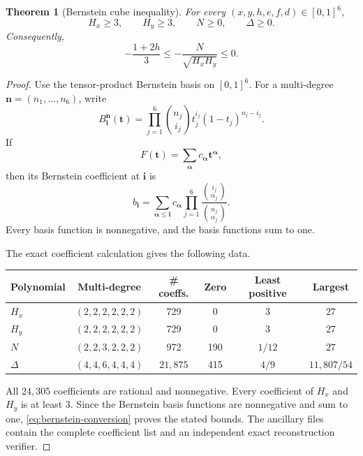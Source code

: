 \documentclass[11pt]{amsart}
\newtheorem{theorem}{Theorem}[section]
\theoremstyle{definition}
\theoremstyle{remark}
\begin{document}
\begin{theorem}[Bernstein cube inequality]\label{thm:cube}
For every \((x,y,h,e,f,d)\in[0,1]^6\),
\[
 H_x\geq3,
 \qquad
 H_y\geq3,
 \qquad
 N\geq0,
 \qquad
 \Delta\geq0.
\]
Consequently,
\begin{equation}\label{eq:cube-correlation}
 -\frac{1+2h}{3}
 \leq
 -\frac{N}{\sqrt{H_xH_y}}
 \leq0.
\end{equation}
\end{theorem}

\begin{proof}
Use the tensor-product Bernstein basis on \([0,1]^6\). For a multi-degree \(\mathbf n=(n_1,\ldots,n_6)\), write
\[
 B_{\mathbf i}^{\mathbf n}(\mathbf t)
 =\prod_{j=1}^6
 \binom{n_j}{i_j}t_j^{i_j}(1-t_j)^{n_j-i_j}.
\]
If
\[
 F(\mathbf t)=\sum_{\boldsymbol\alpha}c_{\boldsymbol\alpha}
 \mathbf t^{\boldsymbol\alpha},
\]
then its Bernstein coefficient at \(\mathbf i\) is
\begin{equation}\label{eq:bernstein-conversion}
 b_{\mathbf i}
 =\sum_{\boldsymbol\alpha\leq\mathbf i}
 c_{\boldsymbol\alpha}
 \prod_{j=1}^6
 \frac{\binom{i_j}{\alpha_j}}
 {\binom{n_j}{\alpha_j}}.
\end{equation}
Every basis function is nonnegative, and the basis functions sum to one.

The exact coefficient calculation gives the following data.
\begin{center}
\small
\begin{tabular}{@{}lccccc@{}}
\toprule
Polynomial & Multi-degree & \# coeffs. & Zero & Least positive & Largest\\
\midrule
\(H_x\) & \((2,2,2,2,2,2)\) & 729 & 0 & \(3\) & \(27\)\\
\(H_y\) & \((2,2,2,2,2,2)\) & 729 & 0 & \(3\) & \(27\)\\
\(N\) & \((2,2,3,2,2,2)\) & 972 & 190 & \(1/12\) & \(27\)\\
\(\Delta\) & \((4,4,6,4,4,4)\) & \(21{,}875\) & 415 & \(4/9\) & \(11{,}807/54\)\\
\bottomrule
\end{tabular}
\end{center}
All \(24{,}305\) coefficients are rational and nonnegative. Every
coefficient of \(H_x\) and \(H_y\) is at least $3$. Since the Bernstein
basis functions are nonnegative and sum to one,
\eqref{eq:bernstein-conversion} proves the stated bounds. The ancillary
files contain the complete coefficient list and an independent exact
reconstruction verifier.
\end{proof}
\end{document}
